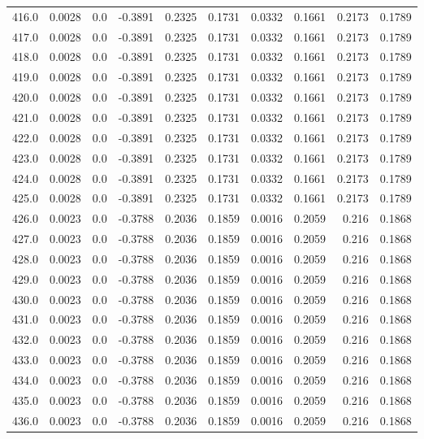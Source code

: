 \begin{longtable}{lrrrrrrrrr}
416.0 & 0.0028 & 0.0 & -0.3891 & 0.2325 & 0.1731 & 0.0332 & 0.1661 & 0.2173 & 0.1789 \\
417.0 & 0.0028 & 0.0 & -0.3891 & 0.2325 & 0.1731 & 0.0332 & 0.1661 & 0.2173 & 0.1789 \\
418.0 & 0.0028 & 0.0 & -0.3891 & 0.2325 & 0.1731 & 0.0332 & 0.1661 & 0.2173 & 0.1789 \\
419.0 & 0.0028 & 0.0 & -0.3891 & 0.2325 & 0.1731 & 0.0332 & 0.1661 & 0.2173 & 0.1789 \\
420.0 & 0.0028 & 0.0 & -0.3891 & 0.2325 & 0.1731 & 0.0332 & 0.1661 & 0.2173 & 0.1789 \\
421.0 & 0.0028 & 0.0 & -0.3891 & 0.2325 & 0.1731 & 0.0332 & 0.1661 & 0.2173 & 0.1789 \\
422.0 & 0.0028 & 0.0 & -0.3891 & 0.2325 & 0.1731 & 0.0332 & 0.1661 & 0.2173 & 0.1789 \\
423.0 & 0.0028 & 0.0 & -0.3891 & 0.2325 & 0.1731 & 0.0332 & 0.1661 & 0.2173 & 0.1789 \\
424.0 & 0.0028 & 0.0 & -0.3891 & 0.2325 & 0.1731 & 0.0332 & 0.1661 & 0.2173 & 0.1789 \\
425.0 & 0.0028 & 0.0 & -0.3891 & 0.2325 & 0.1731 & 0.0332 & 0.1661 & 0.2173 & 0.1789 \\
426.0 & 0.0023 & 0.0 & -0.3788 & 0.2036 & 0.1859 & 0.0016 & 0.2059 & 0.216 & 0.1868 \\
427.0 & 0.0023 & 0.0 & -0.3788 & 0.2036 & 0.1859 & 0.0016 & 0.2059 & 0.216 & 0.1868 \\
428.0 & 0.0023 & 0.0 & -0.3788 & 0.2036 & 0.1859 & 0.0016 & 0.2059 & 0.216 & 0.1868 \\
429.0 & 0.0023 & 0.0 & -0.3788 & 0.2036 & 0.1859 & 0.0016 & 0.2059 & 0.216 & 0.1868 \\
430.0 & 0.0023 & 0.0 & -0.3788 & 0.2036 & 0.1859 & 0.0016 & 0.2059 & 0.216 & 0.1868 \\
431.0 & 0.0023 & 0.0 & -0.3788 & 0.2036 & 0.1859 & 0.0016 & 0.2059 & 0.216 & 0.1868 \\
432.0 & 0.0023 & 0.0 & -0.3788 & 0.2036 & 0.1859 & 0.0016 & 0.2059 & 0.216 & 0.1868 \\
433.0 & 0.0023 & 0.0 & -0.3788 & 0.2036 & 0.1859 & 0.0016 & 0.2059 & 0.216 & 0.1868 \\
434.0 & 0.0023 & 0.0 & -0.3788 & 0.2036 & 0.1859 & 0.0016 & 0.2059 & 0.216 & 0.1868 \\
435.0 & 0.0023 & 0.0 & -0.3788 & 0.2036 & 0.1859 & 0.0016 & 0.2059 & 0.216 & 0.1868 \\
436.0 & 0.0023 & 0.0 & -0.3788 & 0.2036 & 0.1859 & 0.0016 & 0.2059 & 0.216 & 0.1868 \\

\end{longtable}
